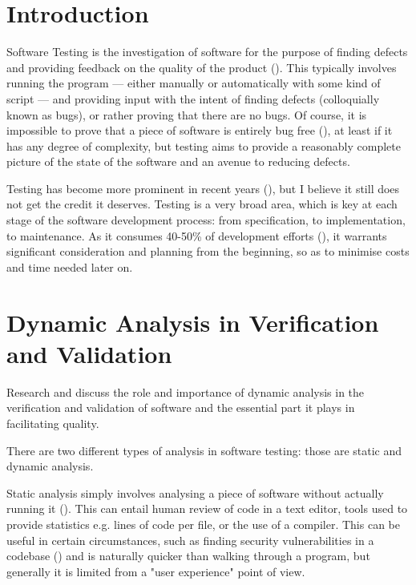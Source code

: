 \documentclass[12pt]{article}
\begin{document}
\pagebreak


\tableofcontents
\pagebreak



\section{Introduction}

Software Testing is the investigation of software for the purpose of finding defects and providing feedback on the quality of the product (). This typically involves running the program --- either manually or automatically with some kind of script --- and providing input with the intent of finding defects (colloquially known as bugs), or rather proving that there are no bugs. Of course, it is impossible to prove that a piece of software is entirely bug free (), at least if it has any degree of complexity, but testing aims to provide a reasonably complete picture of the state of the software and an avenue to reducing defects.

Testing has become more prominent in recent years (), but I believe it still does not get the credit it deserves. Testing is a very broad area, which is key at each stage of the software development process: from specification, to implementation, to maintenance. As it consumes 40-50\% of development efforts (), it warrants significant consideration and planning from the beginning, so as to minimise costs and time needed later on.



\section{Dynamic Analysis in Verification and Validation}
Research and discuss the role and importance of dynamic analysis in the verification and validation of software and the essential part it plays in facilitating quality.

There are two different types of analysis in software testing: those are static and dynamic analysis. 

Static analysis simply involves analysing a piece of software without actually running it (). This can entail human review of code in a text editor, tools used to provide statistics e.g. lines of code per file, or the use of a compiler. This can be useful in certain circumstances, such as finding security vulnerabilities in a codebase () and is naturally quicker than walking through a program, but generally it is limited from a "user experience" point of view.
\end{document}
